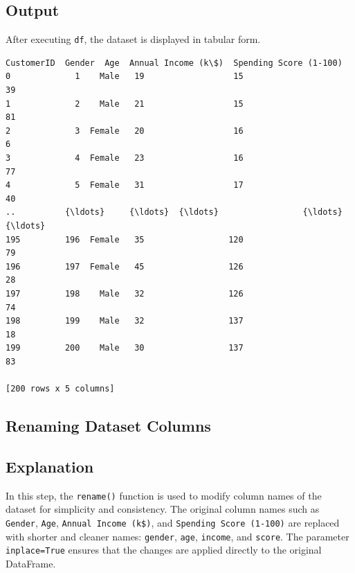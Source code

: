 \documentclass[11pt]{article}
\makeatletter
\newcommand{\boxspacing}{\kern\kvtcb@left@rule\kern\kvtcb@boxsep}
\newcommand{\prompt}[4]{
        {\ttfamily\llap{{\color{#2}[#3]:\hspace{3pt}#4}}\vspace{-\baselineskip}}
    }
\makeatother
\begin{document}
\subsection*{Output}
After executing \texttt{df}, the dataset is displayed in tabular form. 

            \begin{tcolorbox}[breakable, size=fbox, boxrule=.5pt, pad at break*=1mm, opacityfill=0]
\prompt{Out}{outcolor}{3}{\boxspacing}
\begin{Verbatim}[commandchars=\\\{\}]
     CustomerID  Gender  Age  Annual Income (k\$)  Spending Score (1-100)
0             1    Male   19                  15                      39
1             2    Male   21                  15                      81
2             3  Female   20                  16                       6
3             4  Female   23                  16                      77
4             5  Female   31                  17                      40
..          {\ldots}     {\ldots}  {\ldots}                 {\ldots}                     {\ldots}
195         196  Female   35                 120                      79
196         197  Female   45                 126                      28
197         198    Male   32                 126                      74
198         199    Male   32                 137                      18
199         200    Male   30                 137                      83

[200 rows x 5 columns]
\end{Verbatim}
\end{tcolorbox}


\subsection{Renaming Dataset Columns}
\subsection*{Explanation}
In this step, the \texttt{rename()} function is used to modify column names of the dataset for simplicity and consistency. The original column names such as \texttt{Gender}, \texttt{Age}, \texttt{Annual Income (k\$)}, and \texttt{Spending Score (1-100)} are replaced with shorter and cleaner names: \texttt{gender}, \texttt{age}, \texttt{income}, and \texttt{score}. The parameter \texttt{inplace=True} ensures that the changes are applied directly to the original DataFrame.
\end{document}
